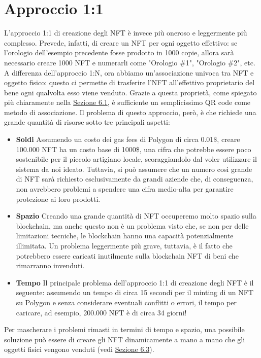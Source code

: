 \documentclass[12pt]{report}
\begin{document}
\section{Approccio 1:1}
\label{sec:1to1}
L'approccio 1:1 di creazione degli NFT è invece più oneroso e leggermente più complesso. Prevede, infatti, di creare un NFT per ogni oggetto effettivo: se l'orologio dell'esempio precedente fosse prodotto in 1000 copie, allora sarà necessario creare 1000 NFT e numerarli come "Orologio \#1", "Orologio \#2", etc.\newline
A differenza dell'approccio 1:N, ora abbiamo un'associazione univoca tra NFT e oggetto fisico: questo ci permette di trasferire l'NFT all'effettivo proprietario del bene ogni qualvolta esso viene venduto. Grazie a questa proprietà, come spiegato più chiaramente nella \hyperref[sec:idea1]{Sezione 6.1}, è sufficiente un semplicissimo QR code come metodo di associazione.\newpage
\noindent
Il problema di questo approccio, però, è che richiede una grande quantità di risorse sotto tre principali aspetti:
\begin{itemize}[topsep=5pt, itemsep=0pt]
    \item \textbf{Soldi}\newline
    Assumendo un costo dei gas fees di Polygon di circa 0.01\$, creare 100.000 NFT ha un costo base di 1000\$, una cifra che potrebbe essere poco sostenibile per il piccolo artigiano locale, scoraggiandolo dal voler utilizzare il sistema da noi ideato.\newline
    Tuttavia, si può assumere che un numero così grande di NFT sarà richiesto esclusivamente da grandi aziende che, di conseguenza, non avrebbero problemi a spendere una cifra medio-alta per garantire protezione ai loro prodotti.
    \item \textbf{Spazio}\newline
    Creando una grande quantità di NFT occuperemo molto spazio sulla blockchain, ma anche questo non è un problema visto che, se non per delle limitazioni tecniche, le blockchain hanno una capacità potenzialmente illimitata.\newline
    Un problema leggermente più grave, tuttavia, è il fatto che potrebbero essere caricati inutilmente sulla blockchain NFT di beni che rimarranno invenduti.
    \item \textbf{Tempo}\newline
    Il principale problema dell'approccio 1:1 di creazione degli NFT è il seguente: assumendo un tempo di circa 15 secondi per il minting di un NFT su Polygon e senza considerare eventuali conflitti o errori, il tempo per caricare, ad esempio, 200.000 NFT è di circa 34 giorni!
\end{itemize}
Per mascherare i problemi rimasti in termini di tempo e spazio, una possibile soluzione può essere di creare gli NFT dinamicamente a mano a mano che gli oggetti fisici vengono venduti (vedi \hyperref[sec:vendere]{Sezione 6.3}).\newpage
\end{document}
